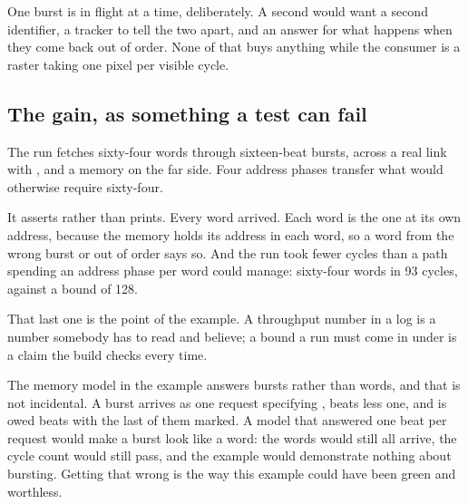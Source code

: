One burst is in flight at a time, deliberately. A second would want a
second identifier, a tracker to tell the two apart, and an answer for
what happens when they come back out of order. None of that buys
anything while the consumer is a raster taking one pixel per visible
cycle.

\subsection{The gain, as something a test can fail}

The run fetches sixty-four words through sixteen-beat bursts, across a
real link with ,  and a memory on the far
side. Four address phases transfer what would otherwise require sixty-four.

It asserts rather than prints. Every word arrived. Each word is the
one at its own address, because the memory holds its address in each
word, so a word from the wrong burst or out of order says so. And the
run took fewer cycles than a path spending an address phase per word
could manage: sixty-four words in 93 cycles, against a bound of 128.

That last one is the point of the example. A throughput number in a
log is a number somebody has to read and believe; a bound a run must
come in under is a claim the build checks every time.

The memory model in the example answers bursts rather than words, and
that is not incidental. A burst arrives as one request specifying
, beats less one, and is owed  beats with the
last of them marked. A model that answered one beat per request would
make a burst look like a word: the words would still all arrive, the
cycle count would still pass, and the example would demonstrate
nothing about bursting. Getting that wrong is the way this example
could have been green and worthless.


